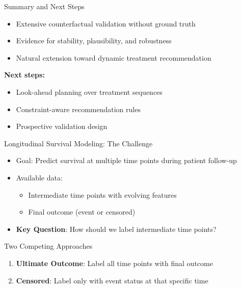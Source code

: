 \documentclass{beamer}
\begin{document}
\begin{frame}{Summary and Next Steps}
\begin{itemize}
    \item Extensive counterfactual validation without ground truth
    \item Evidence for stability, plausibility, and robustness
    \item Natural extension toward dynamic treatment recommendation
\end{itemize}

\vspace{0.5em}
\textbf{Next steps:}
\begin{itemize}
    \item Look-ahead planning over treatment sequences
    \item Constraint-aware recommendation rules
    \item Prospective validation design
\end{itemize}
\end{frame}


\begin{frame}{Longitudinal Survival Modeling: The Challenge}
\begin{itemize}
    \item Goal: Predict survival at multiple time points during patient follow-up
    \item Available data:
    \begin{itemize}
        \item Intermediate time points with evolving features
        \item Final outcome (event or censored)
    \end{itemize}
    \item \textbf{Key Question}: How should we label intermediate time points?
\end{itemize}

\vspace{0.3cm}
\begin{block}{Two Competing Approaches}
\begin{enumerate}
    \item \textbf{Ultimate Outcome}: Label all time points with final outcome
    \item \textbf{Censored}: Label only with event status at that specific time
\end{enumerate}
\end{block}
\end{frame}
\end{document}
